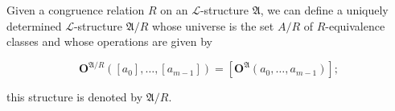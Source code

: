 Given a congruence relation $R$ on an $\mathcal{L}$-structure $\mathfrak{A}$, we can define a uniquely determined $\mathcal{L}$-structure $\mathfrak{A}/R$ whose universe is the set $A/R$ of $R$-equivalence classes and whose operations are given by

$$\mathbf{O}^{\mathfrak{A}/R}([a_0], \ldots, [a_{m-1}]) = [\mathbf{O}^{\mathfrak{A}}(a_0, \ldots, a_{m-1})];$$

this structure is denoted by $\mathfrak{A}/R$.
